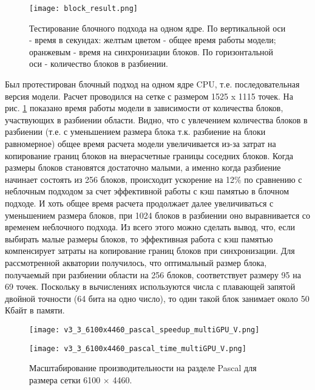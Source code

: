 \begin{figure}[htb!]
    \center
    \texttt{[image: block\_result.png]}
    \caption{Тестирование блочного подхода на одном ядре. По вертикальной оси - время в секундах: желтым цветом - общее время работы модели; оранжевым - время на синхронизации блоков. По горизонтальной оси - количество блоков в разбиении.}
    \label{fig:block_res}
\end{figure}
    
Был протестирован блочный подход на одном ядре CPU, т.е. последовательная версия модели.
Расчет проводился на сетке с размером 1525 x 1115 точек.
На рис. \ref{fig:block_res} показано время работы модели в зависимости от количества блоков, участвующих в разбиении области. Видно, что с увлечением количества блоков в разбиении (т.е. с уменьшением размера блока т.к. разбиение на блоки равномерное) общее время расчета модели увеличивается из-за затрат на копирование границ блоков на внерасчетные границы соседних блоков.
Когда размеры блоков становятся достаточно малыми, а именно когда разбиение начинает состоять из 256 блоков, происходит ускорение на 12\% по сравнению с неблочным подходом за счет эффективной работы с кэш памятью в блочном подходе.
И хоть общее время расчета продолжает далее увеличиваться с уменьшением размера блоков, при 1024 блоков в разбиении оно выравнивается со временем неблочного подхода.
Из всего этого можно сделать вывод, что, если выбирать малые размеры блоков, то эффективная работа с кэш памятью компенсирует затраты на копирование границ блоков при синхронизации.
Для рассмотренной акватории получилось, что оптимальный размер блока, получаемый
при разбиении области на 256 блоков, соответствует размеру 95 на 69 точек. Поскольку в вычислениях используются числа с плавающей запятой двойной точности (64 бита на одно число), то один такой блок занимает около 50 Кбайт в памяти.

\begin{figure}[!ht]
	\begin{minipage}{0.5\linewidth}
	\centering
	\texttt{[image: v3\_3\_6100x4460\_pascal\_speedup\_multiGPU\_V.png]}
	\end{minipage}
	\begin{minipage}{0.5\linewidth}
	\centering
    \texttt{[image: v3\_3\_6100x4460\_pascal\_time\_multiGPU\_V.png]}
	\end{minipage}
	\vspace{3pt}
	\caption{Масштабирование производительности на разделе Pascal для размера сетки 6100 $\times$ 4460.}
	\label{fig:TheBox}
\end{figure}

